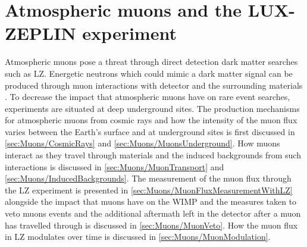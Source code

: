 \chapter{Atmospheric muons and the LUX-ZEPLIN experiment}\label{chap:Muons}
Atmospheric muons pose a threat through direct detection dark matter searches such as LZ. Energetic neutrons which could mimic a dark matter signal can be produced through muon interactions with detector and the surrounding materials \cite{LZ_SIMS}. To decrease the impact that atmospheric muons have on rare event searches, experiments are situated at deep underground sites. 
The production mechanisms for atmospheric muons from cosmic rays and how the intensity of the muon flux varies between the Earth's surface and at underground sites is first discussed in \autoref{sec:Muons/CosmicRays} and \autoref{sec:Muons/MuonsUnderground}. How muons interact as they travel through materials and the induced backgrounds from such interactions is discussed in \autoref{sec:Muons/MuonTransport} and \autoref{sec:Muons/InducedBackgrounds}. The measurement of the muon flux through the LZ experiment is presented in \autoref{sec:Muons/MuonFluxMeasurementWithLZ} alongside the impact that muons have on the WIMP and the measures taken to veto muons events and the additional aftermath left in the detector after a muon has travelled through is discussed in \autoref{sec:Muons/MuonVeto}. How the muon flux in LZ modulates over time is discussed in \autoref{sec:Muons/MuonModulation}.

